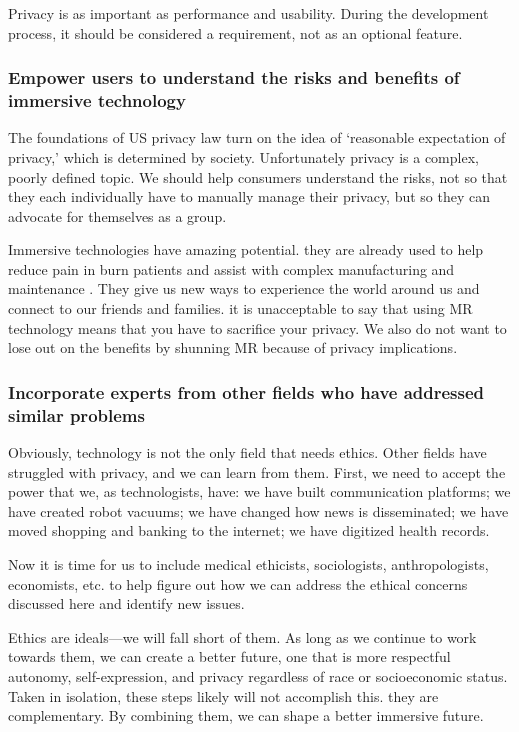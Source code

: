 Privacy is as important as performance and usability. During the development process, it should be considered a requirement, not as an optional feature.

\subsubsection{Empower users to understand the risks and benefits of immersive technology}

The foundations of US privacy law turn on the idea of `reasonable expectation of privacy,' which is determined by society. Unfortunately privacy is a complex, poorly defined topic. We should help consumers understand the risks, not so that they each individually have to manually manage their privacy, but so they can advocate for themselves as a group.

Immersive technologies have amazing potential. they are already used to help reduce pain in burn patients \cite{hoffman2001effectiveness} and assist with complex manufacturing and maintenance \cite{palmarini2018systematic}. They give us new ways to experience the world around us and connect to our friends and families. it is unacceptable to say that using MR technology means that you have to sacrifice your privacy. We also do not want to lose out on the benefits by shunning MR because of privacy implications.

\subsubsection{Incorporate experts from other fields who have addressed similar problems}

Obviously, technology is not the only field that needs ethics. Other fields have struggled with privacy, and we can learn from them. First, we need to accept the power that we, as technologists, have: we have built communication platforms; we have created robot vacuums; we have changed how news is disseminated; we have moved shopping and banking to the internet; we have digitized health records.

Now it is time for us to include medical ethicists, sociologists, anthropologists, economists, etc. to help figure out how we can address the ethical concerns discussed here and identify new issues.

Ethics are ideals---we will fall short of them. As long as we continue to work towards them, we can create a better future, one that is more respectful autonomy, self-expression, and privacy regardless of race or socioeconomic status. Taken in isolation, these steps likely will not accomplish this. they are complementary. By combining them, we can shape a better immersive future.